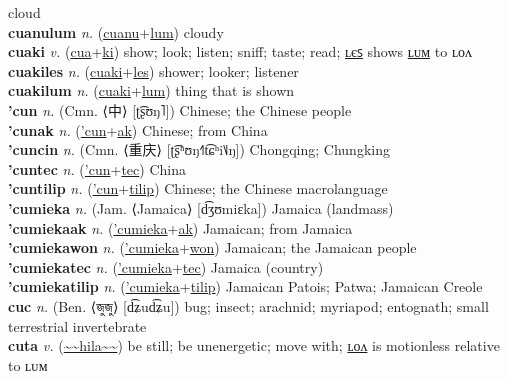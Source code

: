 cloud \label{cuanules} \\
\textbf{cuanulum} \textit{n.} (\hyperref[cuanu]{cuanu}+\hyperref[lum]{lum})
cloudy \label{cuanulum} \\
\textbf{cuaki} \textit{v.} (\hyperref[cua]{cua}+\hyperref[ki]{ki})
show; look; listen; sniff; taste; read; \hyperref[cuakiles]{ʟєꜱ} shows \hyperref[cuakilum]{ʟᴜᴍ} to ʟᴏᴧ \label{cuaki} \\
\textbf{cuakiles} \textit{n.} (\hyperref[cuaki]{cuaki}+\hyperref[les]{les})
shower; looker; listener \label{cuakiles} \\
\textbf{cuakilum} \textit{n.} (\hyperref[cuaki]{cuaki}+\hyperref[lum]{lum})
thing that is shown \label{cuakilum} \\
\textbf{'cun} \textit{n.} (Cmn. ⟨中⟩ [ʈ͡ʂʊŋ˥])
Chinese; the Chinese people \label{'cun} \\
\textbf{'cunak} \textit{n.} (\hyperref['cun]{'cun}+\hyperref[ak]{ak})
Chinese; from China \label{'cunak} \\
\textbf{'cuncin} \textit{n.} (Cmn. ⟨重庆⟩ [ʈ͡ʂʰʊŋ˧˥t͡ɕʰi˥˩ŋ])
Chongqing; Chungking \label{'cuncin} \\
\textbf{'cuntec} \textit{n.} (\hyperref['cun]{'cun}+\hyperref[tec]{tec})
China \label{'cuntec} \\
\textbf{'cuntilip} \textit{n.} (\hyperref['cun]{'cun}+\hyperref[tilip]{tilip})
Chinese; the Chinese macrolanguage \label{'cuntilip} \\
\textbf{'cumieka} \textit{n.} (Jam. ⟨Jamaica⟩ [d͡ʒʊmiɛka])
Jamaica (landmass) \label{'cumieka} \\
\textbf{'cumiekaak} \textit{n.} (\hyperref['cumieka]{'cumieka}+\hyperref[ak]{ak})
Jamaican; from Jamaica \label{'cumiekaak} \\
\textbf{'cumiekawon} \textit{n.} (\hyperref['cumieka]{'cumieka}+\hyperref[won]{won})
Jamaican; the Jamaican people \label{'cumiekawon} \\
\textbf{'cumiekatec} \textit{n.} (\hyperref['cumieka]{'cumieka}+\hyperref[tec]{tec})
Jamaica (country) \label{'cumiekatec} \\
\textbf{'cumiekatilip} \textit{n.} (\hyperref['cumieka]{'cumieka}+\hyperref[tilip]{tilip})
Jamaican Patois; Patwa; Jamaican Creole \label{'cumiekatilip} \\
\textbf{cuc} \textit{n.} (Ben. ⟨জুজু⟩ [d͡ʑud͡ʑu])
bug; insect; arachnid; myriapod; entognath; small terrestrial invertebrate \label{cuc} \\
\textbf{cuta} \textit{v.} (\hyperref[hila]{\~{}\~{}hila\~{}\~{}})
be still; be unenergetic; move with; \hyperref[cutalon]{ʟᴏᴧ} is motionless relative to ʟᴜᴍ \label{cuta} \\
